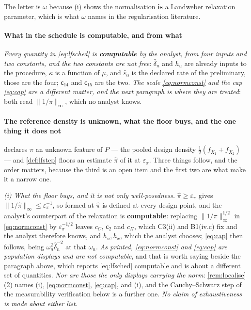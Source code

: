 The letter is $\omega$ because (i) shows the normalisation \textbf{is} a
Landweber relaxation parameter, which is what $\omega$ names in the regularisation literature.

\paragraph{What in the schedule is computable, and from what}

\emph{Every quantity in \eqref{eq:lfsched} is \textbf{computable} by the analyst, from four inputs and
two constants, and the two constants are not free}: $\hat\delta_n$ and $h_u$ are already inputs to the
procedure, $\kappa$ is a function of $\mu$, and $\hat\varepsilon_0$ is the declared rate of the
preliminary, those are the four; $\mathsf c_{14}$ and $\mathsf c_{15}$ are the two.
\emph{The scale \eqref{eq:normconst} and the cap \eqref{eq:cap} are a different matter, and the next
paragraph is where they are treated}: both read $\|1/\pi\|_\infty$, which no analyst knows.

\paragraph{The reference density is unknown, what the floor buys, and the one thing it does not}

 declares $\pi$ an unknown feature of $P$ --- the pooled design density
$\tfrac12(f_{X_1}+f_{X_2})$ --- and \cref{def:lfstep} floors an estimate $\hat\pi$ of it at
$\varepsilon_\pi$. Three things follow, and the order matters, because the third is an open item and the
first two are what make it a narrow one.

\emph{(i) What the floor buys, and it is not only well-posedness.} $\hat\pi\ge\varepsilon_\pi$ gives
$\|1/\hat\pi\|_\infty\le\varepsilon_\pi^{-1}$, so  formed at $\hat\pi$ is defined at
every design point, and the analyst's counterpart of the relaxation is \textbf{computable}: replacing
$\|1/\pi\|^{1/2}_\infty$ in \eqref{eq:normconst} by $\varepsilon_\pi^{-1/2}$ leaves $c_C$,
$\mathsf c_2$ and $c_\Pi$, which C3(ii) and B1(iv.c) fix and the analyst therefore knows, and $h_u,h_x$,
which the analyst chooses; \eqref{eq:cap} then follows, being $\omega_n^{2}\hat\delta_n^{-2}$ at that
$\omega_n$.
\emph{As printed, \eqref{eq:normconst} and \eqref{eq:cap} are population displays and are not
computable}, and that is worth saying beside the paragraph above, which reports \eqref{eq:lfsched}
computable and is about a different set of quantities. \emph{Nor are those the only displays carrying
the norm}: \cref{rem:localise}\textup{(2)} names \textup{(i)},
\eqref{eq:normconst}, \eqref{eq:cap},  and \textup{(i)}, and
the Cauchy--Schwarz step of the measurability verification below is a further one. \emph{No claim of
exhaustiveness is made about either list.}


